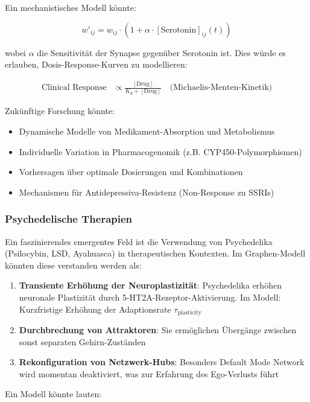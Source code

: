 \documentclass[a4paper,12pt]{article}
\theoremstyle{definition}
\begin{document}
Ein mechanistisches Modell könnte:

\begin{equation}
w'_{ij} = w_{ij} \cdot (1 + \alpha \cdot [\text{Serotonin}]_{ij}(t))
\end{equation}

wobei $\alpha$ die Sensitivität der Synapse gegenüber Serotonin ist. Dies würde es erlauben, Dosis-Response-Kurven zu modellieren:

\begin{align}
\text{Clinical Response} &\propto \frac{[\text{Drug}]}{K_d + [\text{Drug}]} \quad \text{(Michaelis-Menten-Kinetik)}
\end{align}

Zukünftige Forschung könnte:
\begin{itemize}
	\item Dynamische Modelle von Medikament-Absorption und Metabolismus
	\item Individuelle Variation in Pharmacogenomik (z.B. CYP450-Polymorphismen)
	\item Vorhersagen über optimale Dosierungen und Kombinationen
	\item Mechanismen für Antidepressiva-Resistenz (Non-Response zu SSRIs)
\end{itemize}

\subsubsection{Psychedelische Therapien}

Ein faszinierendes emergentes Feld ist die Verwendung von Psychedelika (Psilocybin, LSD, Ayahuasca) in therapeutischen Kontexten. Im Graphen-Modell könnten diese verstanden werden als:

\begin{enumerate}
	\item \textbf{Transiente Erhöhung der Neuroplastizität}: Psychedelika erhöhen neuronale Plastizität durch 5-HT2A-Rezeptor-Aktivierung. Im Modell: Kurzfristige Erhöhung der Adaptionsrate $\tau_{\text{plasticity}}$
	\item \textbf{Durchbrechung von Attraktoren}: Sie ermöglichen Übergänge zwischen sonst separaten Gehirn-Zuständen
	\item \textbf{Rekonfiguration von Netzwerk-Hubs}: Besonders Default Mode Network wird momentan deaktiviert, was zur Erfahrung des Ego-Verlusts führt
\end{enumerate}

Ein Modell könnte lauten:
\end{document}
